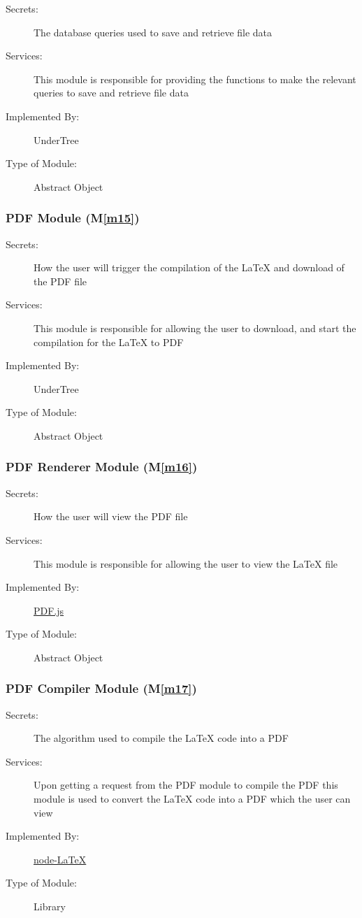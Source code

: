 \documentclass[12pt, titlepage]{article}
\newcommand{\mref}[1]{M\ref{#1}}
\begin{document}
	\begin{description}
		\item[Secrets:] The database queries used to save and retrieve file data
		\item[Services:] This module is responsible for providing the functions to make the relevant queries to save and retrieve file data
		\item[Implemented By:] UnderTree
		\item[Type of Module:] Abstract Object
	\end{description}
	
	\subsubsection{PDF Module (\mref{m15})}
	
	\begin{description}
		\item[Secrets:] How the user will trigger the compilation of the LaTeX and download of the PDF file
		\item[Services:] This module is responsible for allowing the user to download, and start the compilation for the LaTeX to PDF
		\item[Implemented By:] UnderTree
		\item[Type of Module:] Abstract Object
	\end{description}
	
	\subsubsection{PDF Renderer Module (\mref{m16})}
	
	\begin{description}
		\item[Secrets:] How the user will view the PDF file
		\item[Services:] This module is responsible for allowing the user to view the LaTeX file
		\item[Implemented By:] \href{https://mozilla.github.io/pdf.js/examples/}{PDF.js}
		\item[Type of Module:] Abstract Object
	\end{description}
	
	\subsubsection{PDF Compiler Module (\mref{m17})}
	
	\begin{description}
		\item[Secrets:] The algorithm used to compile the LaTeX code into a PDF
		\item[Services:] Upon getting a request from the PDF module to compile the PDF this module is used to convert the LaTeX code into a PDF which the user can view
		\item[Implemented By:] \href{https://www.npmjs.com/package/node-LaTeX}{node-LaTeX}
		\item[Type of Module:] Library
	\end{description}
	
\end{document}
